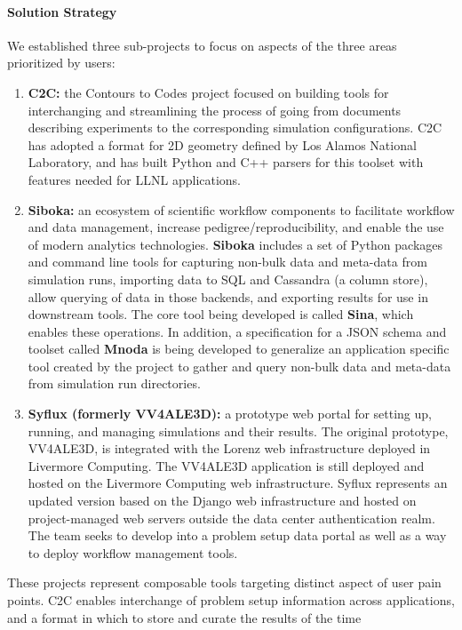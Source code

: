 \paragraph{Solution Strategy}

We established three sub-projects to focus on aspects of the three areas prioritized by users:
\begin{enumerate}
\item \textbf{C2C:} the Contours to Codes project focused on building tools for
interchanging and streamlining the process of going from documents describing
experiments to the corresponding simulation configurations. C2C has adopted a
format for 2D geometry defined by Los Alamos National Laboratory, and has built
Python and C++ parsers for this toolset with features needed for LLNL
applications.  
\item \textbf{Siboka:} an ecosystem of scientific workflow components to
facilitate workflow and data management, increase pedigree/reproducibility, and
enable the use of modern analytics technologies.  \textbf{Siboka} includes a
set of Python packages and command line tools for capturing non-bulk data and
meta-data from simulation runs, importing data to SQL and Cassandra (a column
store), allow querying of data in those backends, and exporting results for use
in downstream tools. The core tool being developed is called \textbf{Sina},
which enables these  operations. In addition, a specification for a JSON
schema and toolset called \textbf{Mnoda} is being developed to generalize an
application specific tool created by the project to gather and query non-bulk
data and meta-data from simulation run directories.
\item \textbf{Syflux (formerly VV4ALE3D):} a prototype web portal for setting
up, running, and managing simulations and their results.  The original
prototype, VV4ALE3D, is integrated with the Lorenz web infrastructure deployed
in Livermore Computing.  The VV4ALE3D application is still deployed and hosted
on the Livermore Computing web infrastructure.  Syflux represents an updated
version based on the Django web infrastructure and hosted on project-managed
web servers outside the data center authentication realm. The team seeks to
develop into a problem setup data portal as well as a way to deploy workflow
management tools.  
\end{enumerate}
These projects represent composable tools targeting distinct aspect of user
pain points.  C2C enables interchange of problem setup information across
applications, and a format in which to store and curate the results of the time
